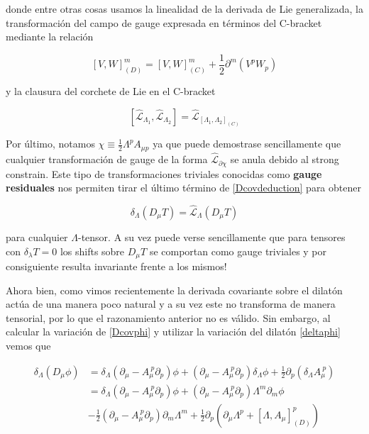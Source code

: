 \documentclass{article}
\numberwithin{equation}{section}
\begin{document}
donde entre otras cosas usamos la linealidad de la derivada de Lie generalizada, la transformación del campo de gauge expresada en términos del C-bracket mediante la relación

\begin{equation}
\left[V,W\right]_{(D)}^{m} = \left[V,W\right]_{(C)}^{m} + \frac{1}{2} \partial^m \left(V^p W_p\right) 
\end{equation}

y la clausura del corchete de Lie en el C-bracket

\begin{equation}
\left[\hat{\mathcal{L}}_{\Lambda_1}, \hat{\mathcal{L}}_{\Lambda_2} \right] = \hat{\mathcal{L}}_{ \left[\Lambda_1, \Lambda_2\right]_{(C)}}
\end{equation}

Por último, notamos $ \chi \equiv \frac{1}{2} \Lambda^p A_{\mu p} $ ya que puede demostrase sencillamente que cualquier transformación de gauge de la forma $ \hat{\mathcal{L}}_{\partial \chi} $ se anula debido al strong constrain. Este tipo de transformaciones triviales conocidas como \textbf{gauge residuales} nos permiten tirar el último término de \ref{Dcovdeduction} para obtener\\

\begin{boxquation}
	\begin{equation}
	\delta_{\Lambda} \left( D_{\mu} T \right) = \hat{\mathcal{L}}_{\Lambda} \left( D_{\mu} T \right)
	\end{equation}
\end{boxquation}


para cualquier $ \Lambda$-tensor. A su vez puede verse sencillamente que para tensores con $ \delta_{\lambda} T = 0 $ los shifts sobre $ D_{\mu} T $ se comportan como gauge triviales y por consiguiente resulta invariante frente a los mismos! 

Ahora bien, como vimos recientemente la derivada covariante sobre el dilatón actúa de una manera poco natural y a su vez este no transforma de manera tensorial, por lo que el razonamiento anterior no es válido. Sin embargo, al calcular la variación de \ref{Dcovphi} y utilizar la variación del dilatón \ref{deltaphi} vemos que 

\begin{equation}
\begin{aligned}
\delta_{\Lambda} \left( D_{\mu} \phi\right) &= \delta_{\Lambda} \left( \partial_{\mu} - A_{\mu}^{\ p} \partial_p \right)\phi + \left( \partial_{\mu} - A_{\mu}^{\ p} \partial_p \right)\delta_{\Lambda} \phi + \frac{1}{2} \partial_p \left( \delta_{\Lambda} A_{\mu}^{\ p} \right)\\
&=\delta_{\Lambda} \left( \partial_{\mu} - A_{\mu}^{\ p} \partial_p \right)\phi + \left( \partial_{\mu} - A_{\mu}^{\ p} \partial_p \right)\Lambda^m \partial_m \phi\\
&-\frac{1}{2}\left( \partial_{\mu} - A_{\mu}^{\ p} \partial_p \right) \partial_m \Lambda^m + \frac{1}{2} \partial_p \left(\partial_{\mu} \Lambda^p + \left[\Lambda, A_{\mu}\right]_{(D)}^p\right) 
\end{aligned}
\end{equation}
\end{document}
